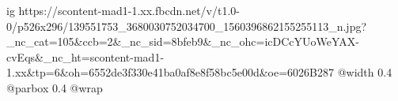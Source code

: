  
 
 
 
 

\ifcmt
  ig https://scontent-mad1-1.xx.fbcdn.net/v/t1.0-0/p526x296/139551753_3680030752034700_1560396862155255113_n.jpg?_nc_cat=105&ccb=2&_nc_sid=8bfeb9&_nc_ohc=icDCcYUoWeYAX-cvEqs&_nc_ht=scontent-mad1-1.xx&tp=6&oh=6552de3f330e41ba0af8e8f58bc5e00d&oe=6026B287
  @width 0.4
	@parbox 0.4
	@wrap \parpic[r]
\fi
